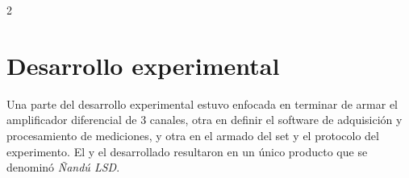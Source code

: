 \documentclass[11pt, letterpaper]{article}
\begin{document}
\begin{multicols*}{2}



\section{Desarrollo experimental}

Una parte del desarrollo experimental estuvo enfocada en terminar de armar el amplificador diferencial de 3 canales, otra en definir el software de adquisición y procesamiento de mediciones, y otra en el armado del set y el protocolo del experimento. El  y el  desarrollado resultaron en un único producto que se denominó \textit{Ñandú LSD}.


\end{multicols*}
\end{document}
